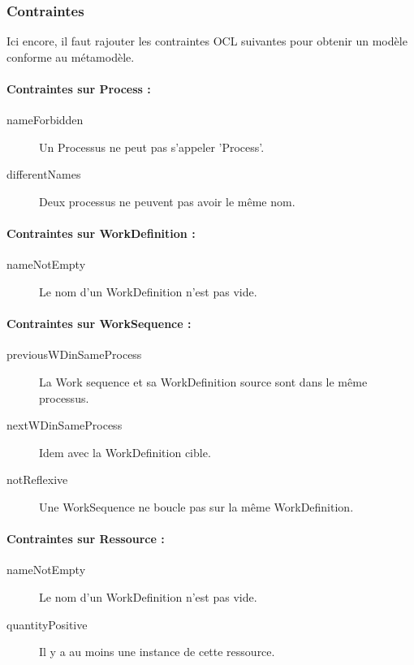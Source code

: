 \documentclass[12pt]{article}
\begin{document}
\subsubsection{Contraintes}
Ici encore, il faut rajouter les contraintes OCL suivantes pour obtenir un modèle conforme au métamodèle.
\paragraph*{Contraintes sur Process :}
\begin{description}
\item[nameForbidden] Un Processus ne peut pas s'appeler 'Process'.
\item[differentNames] Deux processus ne peuvent pas avoir le même nom.
\end{description}

\paragraph*{Contraintes sur WorkDefinition :}
\begin{description}
\item[nameNotEmpty] Le nom d'un WorkDefinition n'est pas vide.
\end{description}

\paragraph*{Contraintes sur WorkSequence :}
\begin{description}
\item[previousWDinSameProcess] La Work sequence et sa WorkDefinition source sont dans le même processus.
\item[nextWDinSameProcess] Idem avec la WorkDefinition cible.
\item[notReflexive] Une WorkSequence ne boucle pas sur la même 
WorkDefinition.
\end{description}

\paragraph*{Contraintes sur Ressource :}
\begin{description}
\item[nameNotEmpty] Le nom d'un WorkDefinition n'est pas vide.
\item[quantityPositive] Il y a au moins une instance de cette ressource.
\end{description}
\end{document}
